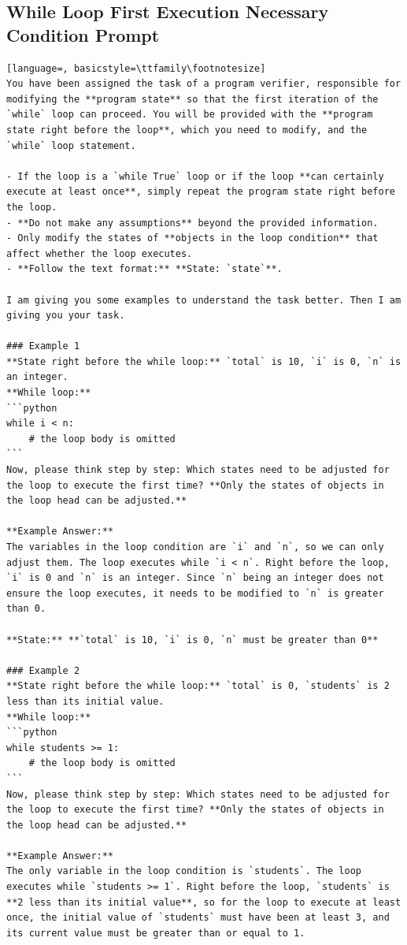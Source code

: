 \documentclass[sigconf]{acmart}
\begin{document}
\subsection{While Loop First Execution Necessary Condition Prompt}
\label{while_first_prompt}
\begin{tcolorbox}[ colback=gray!10, colframe=black, arc=5pt]
\begin{lstlisting}[language=, basicstyle=\ttfamily\footnotesize]
You have been assigned the task of a program verifier, responsible for modifying the **program state** so that the first iteration of the `while` loop can proceed. You will be provided with the **program state right before the loop**, which you need to modify, and the `while` loop statement.

- If the loop is a `while True` loop or if the loop **can certainly execute at least once**, simply repeat the program state right before the loop.
- **Do not make any assumptions** beyond the provided information.
- Only modify the states of **objects in the loop condition** that affect whether the loop executes.
- **Follow the text format:** **State: `state`**.

I am giving you some examples to understand the task better. Then I am giving you your task.

### Example 1  
**State right before the while loop:** `total` is 10, `i` is 0, `n` is an integer.  
**While loop:**  
```python
while i < n:
    # the loop body is omitted
```
Now, please think step by step: Which states need to be adjusted for the loop to execute the first time? **Only the states of objects in the loop head can be adjusted.**

**Example Answer:**  
The variables in the loop condition are `i` and `n`, so we can only adjust them. The loop executes while `i < n`. Right before the loop, `i` is 0 and `n` is an integer. Since `n` being an integer does not ensure the loop executes, it needs to be modified to `n` is greater than 0.

**State:** **`total` is 10, `i` is 0, `n` must be greater than 0**

### Example 2  
**State right before the while loop:** `total` is 0, `students` is 2 less than its initial value.  
**While loop:**  
```python
while students >= 1:
    # the loop body is omitted
```
Now, please think step by step: Which states need to be adjusted for the loop to execute the first time? **Only the states of objects in the loop head can be adjusted.**

**Example Answer:**  
The only variable in the loop condition is `students`. The loop executes while `students >= 1`. Right before the loop, `students` is **2 less than its initial value**, so for the loop to execute at least once, the initial value of `students` must have been at least 3, and its current value must be greater than or equal to 1.


\end{lstlisting}
\end{tcolorbox}
\end{document}
